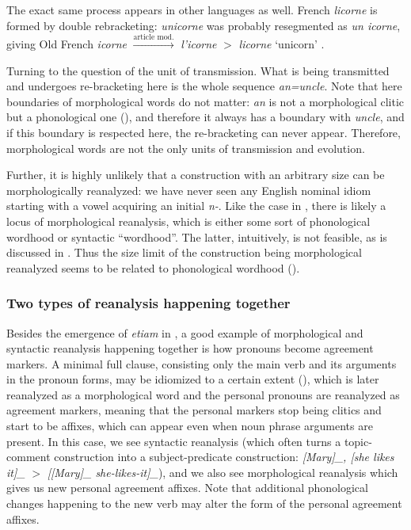 \documentclass[a4paper, oneside, scheme=plain, 12pt]{article}
\newcommand*{\citepage}[1]{p.~{#1}}
\newcommand{\form}[1]{\emph{#1}}
\newcommand*{\textgt}{$>$ }
\newcommand{\translate}[1]{`#1'}
\begin{document}
The exact same process appears in other languages as well.
French \form{licorne} is formed by double rebracketing:
\form{unicorne} was probably resegmented as \form{un icorne},
giving Old French \form{icorne} $\stackrel{\text{article mod.}}{\longrightarrow}$ \form{l'icorne} \textgt \form{licorne} \translate{unicorn}
\citep[\citepage{305}]{alkire2010romance}.

Turning to the question of the unit of transmission.
What is being transmitted and undergoes re-bracketing here is the whole sequence \form{an=uncle}.
Note that here boundaries of morphological words do not matter:
\form{an} is not a morphological clitic but a phonological one (),
and therefore it always has a boundary with \form{uncle},
and if this boundary is respected here, the re-bracketing can never appear.
Therefore, morphological words are not the only units of transmission and evolution.

Further, it is highly unlikely that a construction with an arbitrary size can be morphologically reanalyzed:
we have never seen any English nominal idiom starting with a vowel acquiring an initial \form{n-}.
Like the case in ,
there is likely a locus of morphological reanalysis,
which is either some sort of phonological wordhood or syntactic ``wordhood''.
The latter, intuitively, is not feasible, as is discussed in .
Thus the size limit of the construction being morphological reanalyzed seems to be related to phonological wordhood ().


\subsubsection{Two types of reanalysis happening together}\label{sec:both-types-of-reanalysis}

Besides the emergence of \form{etiam} in ,
a good example of morphological and syntactic reanalysis happening together 
is how pronouns become agreement markers.
A minimal full clause, consisting only the main verb and its arguments in the pronoun forms,
may be idiomized to a certain extent (),
which is later reanalyzed as a morphological word and the personal pronouns are reanalyzed as agreement markers, meaning that the personal markers stop being clitics and start to be affixes,
which can appear even when noun phrase arguments are present.
In this case, we see syntactic reanalysis 
(which often turns a topic-comment construction into a subject-predicate construction:
\form{[Mary]_{}, [she likes it]_{\text{comment:nucleus clause}}} \textgt \form{[[Mary]_{} she-likes-it]_{\text{nucleus clause}}}),
and we also see morphological reanalysis which gives us new personal agreement affixes.
Note that additional phonological changes happening to the new verb may alter the form of the personal agreement affixes.
\end{document}
